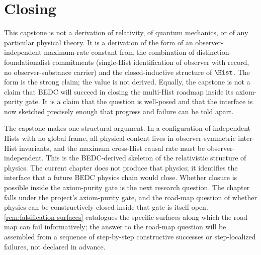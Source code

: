 


\section{Closing}
\label{sec:closing-inter-hist}

\begin{remark}
\label{rem:what-this-is-not}
This capstone is not a derivation of relativity, of quantum mechanics, or of any particular physical theory. It is a derivation of the form of an observer-independent maximum-rate constant from the combination of distinction-foundationalist commitments (single-Hist identification of observer with record, no observer-substance carrier) and the closed-inductive structure of \(\Hist\). The form is the strong claim; the value is not derived. Equally, the capstone is not a claim that BEDC will succeed in closing the multi-Hist roadmap inside its axiom-purity gate. It is a claim that the question is well-posed and that the interface is now sketched precisely enough that progress and failure can be told apart.
\end{remark}

\begin{remark}
\label{rem:closing-physics-from-locality}
The capstone makes one structural argument. In a configuration of independent Hists with no global frame, all physical content lives in observer-symmetric inter-Hist invariants, and the maximum cross-Hist causal rate must be observer-independent. This is the BEDC-derived skeleton of the relativistic structure of physics. The current chapter does not produce that physics; it identifies the interface that a future BEDC physics chain would close. Whether closure is possible inside the axiom-purity gate is the next research question. The chapter falls under the project's axiom-purity gate, and the road-map question of whether physics can be constructively closed inside that gate is itself open. \autoref{rem:falsification-surfaces} catalogues the specific surfaces along which the road-map can fail informatively; the answer to the road-map question will be assembled from a sequence of step-by-step constructive successes or step-localized failures, not declared in advance.
\end{remark}

